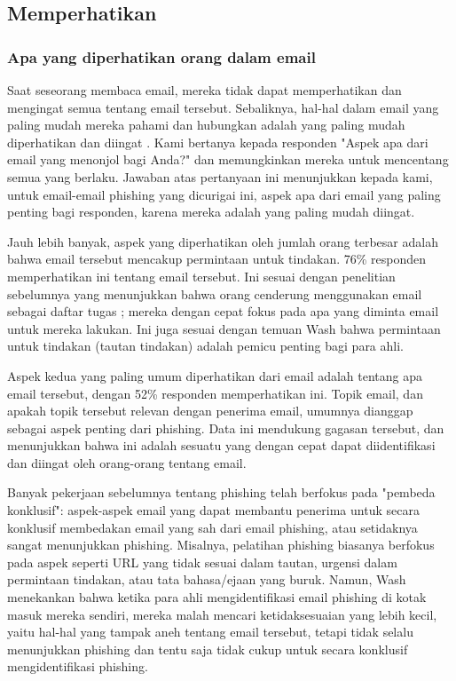 \documentclass[lettersize,journal]{IEEEtran}
\begin{document}
\subsection{Memperhatikan}

\subsubsection{Apa yang diperhatikan orang dalam email}

Saat seseorang membaca email, mereka tidak dapat memperhatikan dan mengingat
semua tentang email tersebut. Sebaliknya, hal-hal dalam email yang paling mudah
mereka pahami dan hubungkan adalah yang paling mudah diperhatikan dan diingat
\cite{satudelapan}. Kami bertanya kepada responden "Aspek apa dari email yang
menonjol bagi Anda?" dan memungkinkan mereka untuk mencentang semua yang
berlaku. Jawaban atas pertanyaan ini menunjukkan kepada kami, untuk email-email
phishing yang dicurigai ini, aspek apa dari email yang paling penting bagi
responden, karena mereka adalah yang paling mudah diingat.

Jauh lebih banyak, aspek yang diperhatikan oleh jumlah orang terbesar adalah
bahwa email tersebut mencakup permintaan untuk tindakan. 76\% responden
memperhatikan ini tentang email tersebut. Ini sesuai dengan penelitian
sebelumnya yang menunjukkan bahwa orang cenderung menggunakan email sebagai
daftar tugas \cite{tigaenam}; mereka dengan cepat fokus pada apa yang diminta
email untuk mereka lakukan. Ini juga sesuai dengan temuan Wash \cite{tigaempat}
bahwa permintaan untuk tindakan (tautan tindakan) adalah pemicu penting bagi
para ahli.

Aspek kedua yang paling umum diperhatikan dari email adalah tentang apa email
tersebut, dengan 52\% responden memperhatikan ini. Topik email, dan apakah
topik tersebut relevan dengan penerima email, umumnya dianggap sebagai aspek
penting dari phishing. Data ini mendukung gagasan tersebut, dan menunjukkan
bahwa ini adalah sesuatu yang dengan cepat dapat diidentifikasi dan diingat
oleh orang-orang tentang email.

Banyak pekerjaan sebelumnya tentang phishing telah berfokus pada "pembeda
konklusif": aspek-aspek email yang dapat membantu penerima untuk secara
konklusif membedakan email yang sah dari email phishing, atau setidaknya sangat
menunjukkan phishing. Misalnya, pelatihan phishing biasanya berfokus pada aspek
seperti URL yang tidak sesuai dalam tautan, urgensi dalam permintaan tindakan,
atau tata bahasa/ejaan yang buruk. Namun, Wash menekankan bahwa ketika para
ahli mengidentifikasi email phishing di kotak masuk mereka sendiri, mereka
malah mencari ketidaksesuaian yang lebih kecil, yaitu hal-hal yang tampak aneh
tentang email tersebut, tetapi tidak selalu menunjukkan phishing dan tentu saja
tidak cukup untuk secara konklusif mengidentifikasi phishing.
\end{document}

